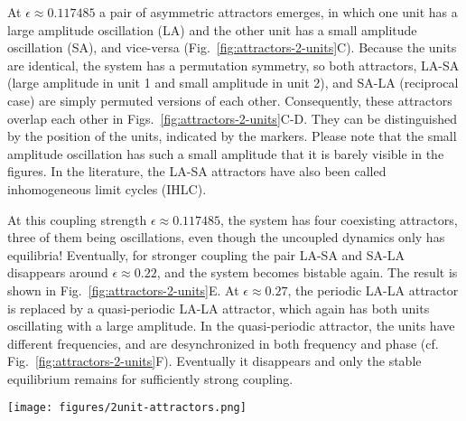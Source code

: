 At $\epsilon \approx 0.117485$ a pair of asymmetric attractors emerges, in which one unit has a large amplitude oscillation (LA) and the other unit has a small amplitude oscillation (SA), and vice-versa (Fig.~\ref{fig:attractors-2-units}C). Because the units are identical, the system has a permutation symmetry, so both attractors, LA-SA (large amplitude in unit 1 and small amplitude in unit 2), and SA-LA (reciprocal case) are simply permuted versions of each other. Consequently, these attractors overlap each other in Figs.~\ref{fig:attractors-2-units}C-D. They can be distinguished by the position of the units, indicated by the markers. Please note that the small amplitude oscillation has such a small amplitude that it is barely visible in the figures. In the literature, the LA-SA attractors have also been called inhomogeneous limit cycles \cite{ullner2008multistability, tyson1975control} (IHLC). %

At this coupling strength $\epsilon \approx 0.117485$, the system has four coexisting attractors, three of them being oscillations, even though the uncoupled dynamics only has equilibria! Eventually, for stronger coupling the pair LA-SA and SA-LA disappears around $\epsilon \approx 0.22$, and the system becomes bistable again. The result is shown in Fig.~\ref{fig:attractors-2-units}E. At $\epsilon \approx 0.27$, the periodic LA-LA attractor is replaced by a quasi-periodic LA-LA attractor, which again has both units oscillating with a large amplitude. In the quasi-periodic attractor, the units have different frequencies, and are desynchronized in both frequency and phase (cf. Fig.~\ref{fig:attractors-2-units}F). Eventually it disappears and only the stable equilibrium remains for sufficiently strong coupling. 
%
\begin{figure*}[ht!]
    \centering
    \texttt{[image: figures/2unit-attractors.png]}
    \caption{Attractors created by the diffusive coupling for $N=2$. Each panel is a projection onto $2D$ space of $x_i-y_i$ for different coupling strengths. The markers denote the positions of the units for an arbitrarily chosen time point, with unit 1 shown as a circle and unit 2 as a diamond. The stable equilibrium is the only attractor existing for weak coupling strengths, as shown for $\epsilon=0.05$. Another attractor emerges at $\epsilon \sim 0.065$ corresponding to two units oscillating with large amplitude - it is thus labelled as LA-LA. A pair of asymmetric attractors emerges at $\epsilon \sim 0.117485$ corresponding to one unit oscillating with large amplitude and the other oscillating with small amplitude; they are labeled respectively as LA-SA and SA-LA. The pair eventually disappears and the system becomes bistable again at $\epsilon=0.25$. At $\epsilon=0.3$, the LA-LA attractor is quasi-periodic. For stronger coupling $\epsilon$, only the stable equilibrium is left.}
    \label{fig:attractors-2-units}
\end{figure*}


